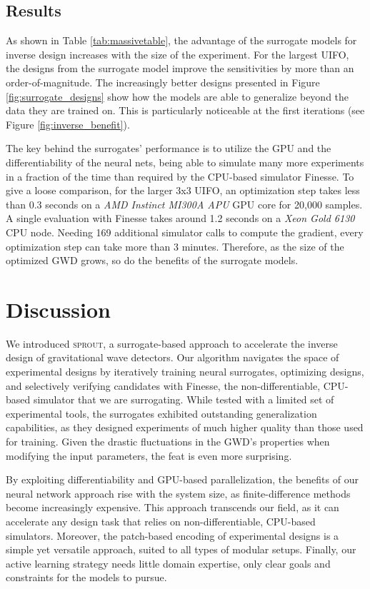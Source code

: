 \documentclass[a4paper,twocolumn,11pt,unpublished]{quantumarticle}
\newcommand{\algorithm}{\textsc{sprout}}
\begin{document}
\subsection{Results}\label{sec:results}
As shown in Table \ref{tab:massivetable}, the advantage of the surrogate models for inverse design increases with the size of the experiment. For the largest UIFO, the designs from the surrogate model improve the sensitivities by more than an order-of-magnitude. The increasingly better designs presented in Figure \ref{fig:surrogate_designs} show how the models are able to generalize beyond the data they are trained on. This is particularly noticeable at the first iterations (see Figure \ref{fig:inverse_benefit}). 

The key behind the surrogates' performance is to utilize the GPU and the differentiability of the neural nets, being able to simulate many more experiments in a fraction of the time than required by the CPU-based simulator Finesse. To give a loose comparison, for the larger 3x3 UIFO, an optimization step takes less than 0.3 seconds on a \textit{AMD Instinct MI300A APU} GPU core for 20,000 samples. A single evaluation with Finesse takes around 1.2 seconds on a \textit{Xeon Gold 6130} CPU node. Needing 169 additional simulator calls to compute the gradient, every optimization step can take more than 3 minutes. Therefore, as the size of the optimized GWD grows, so do the benefits of the surrogate models.


\section{Discussion}
We introduced \algorithm\:, a surrogate-based approach to accelerate the inverse design of gravitational wave detectors. Our algorithm navigates the space of experimental designs by iteratively training neural surrogates, optimizing designs, and selectively verifying candidates with Finesse, the non-differentiable, CPU-based simulator that we are surrogating. While tested with a limited set of experimental tools, the surrogates exhibited outstanding generalization capabilities, as they designed experiments of much higher quality than those used for training. Given the drastic fluctuations in the GWD's properties when modifying the input parameters, the feat is even more surprising.

By exploiting differentiability and GPU-based parallelization, the benefits of our neural network approach rise with the system size, as finite-difference methods become increasingly expensive. This approach transcends our field, as it can accelerate any design task that relies on non-differentiable, CPU-based simulators. Moreover, the patch-based encoding of experimental designs is a simple yet versatile approach, suited to all types of modular setups. Finally, our active learning strategy needs little domain expertise, only clear goals and constraints for the models to pursue.
\end{document}
